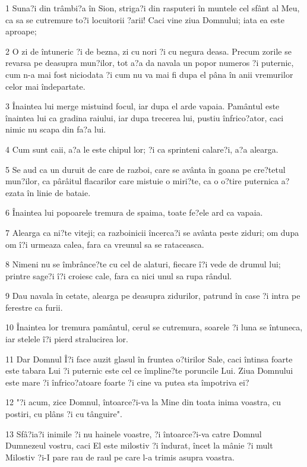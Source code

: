 \par 1 Suna?i din trâmbi?a în Sion, striga?i din rasputeri în muntele cel sfânt al Meu, ca sa se cutremure to?i locuitorii ?arii! Caci vine ziua Domnului; iata ea este aproape;
\par 2 O zi de întuneric ?i de bezna, zi cu nori ?i cu negura deasa. Precum zorile se revarsa pe deasupra mun?ilor, tot a?a da navala un popor numeros ?i puternic, cum n-a mai fost niciodata ?i cum nu va mai fi dupa el pâna în anii vremurilor celor mai îndepartate.
\par 3 Înaintea lui merge mistuind focul, iar dupa el arde vapaia. Pamântul este înaintea lui ca gradina raiului, iar dupa trecerea lui, pustiu înfrico?ator, caci nimic nu scapa din fa?a lui.
\par 4 Cum sunt caii, a?a le este chipul lor; ?i ca sprinteni calare?i, a?a alearga.
\par 5 Se aud ca un duruit de care de razboi, care se avânta în goana pe cre?tetul mun?ilor, ca pârâitul flacarilor care mistuie o miri?te, ca o o?tire puternica a?ezata în linie de bataie.
\par 6 Înaintea lui popoarele tremura de spaima, toate fe?ele ard ca vapaia.
\par 7 Alearga ca ni?te viteji; ca razboinicii încerca?i se avânta peste ziduri; om dupa om î?i urmeaza calea, fara ca vreunul sa se rataceasca.
\par 8 Nimeni nu se îmbrânce?te cu cel de alaturi, fiecare î?i vede de drumul lui; printre sage?i î?i croiesc cale, fara ca nici unul sa rupa rândul.
\par 9 Dau navala în cetate, alearga pe deasupra zidurilor, patrund în case ?i intra pe ferestre ca furii.
\par 10 Înaintea lor tremura pamântul, cerul se cutremura, soarele ?i luna se întuneca, iar stelele î?i pierd stralucirea lor.
\par 11 Dar Domnul Î?i face auzit glasul în fruntea o?tirilor Sale, caci întinsa foarte este tabara Lui ?i puternic este cel ce împline?te poruncile Lui. Ziua Domnului este mare ?i înfrico?atoare foarte ?i cine va putea sta împotriva ei?
\par 12 "?i acum, zice Domnul, întoarce?i-va la Mine din toata inima voastra, cu postiri, cu plâns ?i cu tânguire".
\par 13 Sfâ?ia?i inimile ?i nu hainele voastre, ?i întoarce?i-va catre Domnul Dumnezeul vostru, caci El este milostiv ?i îndurat, încet la mânie ?i mult Milostiv ?i-I pare rau de raul pe care l-a trimis asupra voastra.
